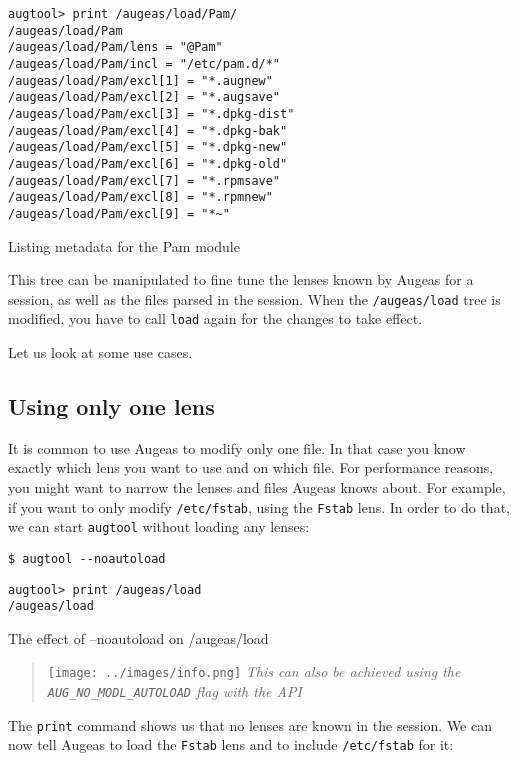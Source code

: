 \begin{listing}
  \begin{verbatim}
augtool> print /augeas/load/Pam/
/augeas/load/Pam
/augeas/load/Pam/lens = "@Pam"
/augeas/load/Pam/incl = "/etc/pam.d/*"
/augeas/load/Pam/excl[1] = "*.augnew"
/augeas/load/Pam/excl[2] = "*.augsave"
/augeas/load/Pam/excl[3] = "*.dpkg-dist"
/augeas/load/Pam/excl[4] = "*.dpkg-bak"
/augeas/load/Pam/excl[5] = "*.dpkg-new"
/augeas/load/Pam/excl[6] = "*.dpkg-old"
/augeas/load/Pam/excl[7] = "*.rpmsave"
/augeas/load/Pam/excl[8] = "*.rpmnew"
/augeas/load/Pam/excl[9] = "*~"
  \end{verbatim}
  \caption{Listing metadata for the Pam module}
  \label{lst:metadata_load_pam}
\end{listing}


This tree can be manipulated to fine tune the lenses known by Augeas for a session, as well as the files parsed in the session. When the \nolinkurl{/augeas/load} tree is modified, you have to call \verb!load! again for the changes to take effect.

Let us look at some use cases.

\subsection{Using only one lens}

It is common to use Augeas to modify only one file. In that case you know exactly which lens you want to use and on which file. For performance reasons, you might want to narrow the lenses and files Augeas knows about. For example, if you want to only modify \nolinkurl{/etc/fstab}, using the \verb!Fstab! lens. In order to do that, we can start \verb!augtool! without loading any lenses:


\begin{listing}
  \begin{verbatim}
$ augtool --noautoload
  \end{verbatim}
  \begin{verbatim}
augtool> print /augeas/load
/augeas/load
  \end{verbatim}
  \caption{The effect of --noautoload on /augeas/load}
  \label{lst:metadata_noautoload}
\end{listing}



\begin{quote}
\texttt{[image: ../images/info.png]} \emph{This can also be achieved using the \texttt{AUG\_NO\_MODL\_AUTOLOAD} flag with the API}

\end{quote}
The \verb!print! command shows us that no lenses are known in the session. We can now tell Augeas to load the \verb!Fstab! lens and to include \nolinkurl{/etc/fstab} for it:

